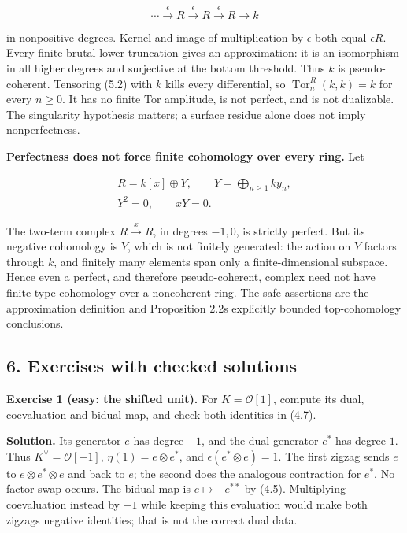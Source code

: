 \documentclass[
  english,
  11pt,
  a4paper,
]{article}
\begin{document}
\[\cdots\xrightarrow{\epsilon}R\xrightarrow{\epsilon}R
\xrightarrow{\epsilon}R\longrightarrow k
\tag{5.2}\]

in nonpositive degrees. Kernel and image of multiplication by
\(\epsilon\) both equal \(\epsilon R\). Every finite brutal lower
truncation gives an approximation: it is an isomorphism in all higher
degrees and surjective at the bottom threshold. Thus \(k\) is
pseudo-coherent. Tensoring (5.2) with \(k\) kills every differential, so
\(\operatorname{Tor}_n^R(k,k)=k\) for every \(n\ge0\). It has no finite
Tor amplitude, is not perfect, and is not dualizable. The singularity
hypothesis matters; a surface residue alone does not imply
nonperfectness.

\textbf{Perfectness does not force finite cohomology over every ring.}
Let

\[\begin{gathered}
R=k[x]\oplus Y,\qquad Y=\bigoplus_{n\ge1}ky_n,\\
Y^2=0,\qquad xY=0.
\end{gathered}
\tag{5.3}\]

The two-term complex \(R\xrightarrow{x}R\), in degrees \(-1,0\), is
strictly perfect. But its negative cohomology is \(Y\), which is not
finitely generated: the action on \(Y\) factors through \(k\), and
finitely many elements span only a finite-dimensional subspace. Hence
even a perfect, and therefore pseudo-coherent, complex need not have
finite-type cohomology over a noncoherent ring. The safe assertions are
the approximation definition and Proposition 2.2\textquotesingle s
explicitly bounded top-cohomology conclusions.

\subsection{6. Exercises with checked
solutions}\label{perfect-complexes-and-duals--6-exercises-with-checked-solutions}

\textbf{Exercise 1 (easy: the shifted unit).} For \(K=\mathcal O[1]\),
compute its dual, coevaluation and bidual map, and check both identities
in (4.7).

\textbf{Solution.} Its generator \(e\) has degree \(-1\), and the dual
generator \(e^*\) has degree \(1\). Thus \(K^\vee=\mathcal O[-1]\),
\(\eta(1)=e\otimes e^*\), and \(\epsilon(e^*\otimes e)=1\). The first
zigzag sends \(e\) to \(e\otimes e^*\otimes e\) and back to \(e\); the
second does the analogous contraction for \(e^*\). No factor swap
occurs. The bidual map is \(e\mapsto-e^{**}\) by (4.5). Multiplying
coevaluation instead by \(-1\) while keeping this evaluation would make
both zigzags negative identities; that is not the correct dual data.
\end{document}

